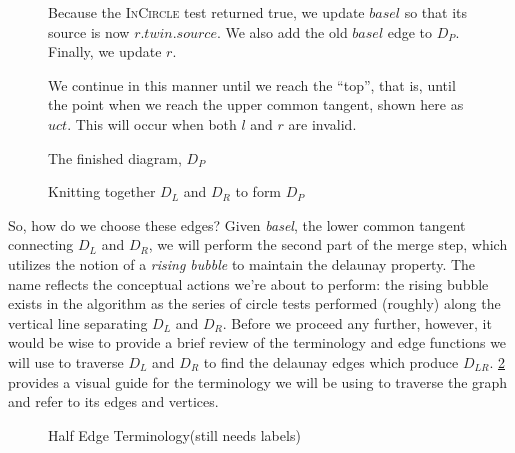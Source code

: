 \documentclass[12pt,twoside]{reedthesis}
\begin{document}
    \begin{figure}[p]
      \ContinuedFloat
      \begin{subtable}{\textwidth}
        \centering
        
        \caption{Because the \textsc{InCircle} test returned true, we update $basel$ so that its source is now $r.twin.source$. We also add the old $basel$ edge to $D_{P}$. Finally, we update $r$.}
        \label{fig:del_knit11}
      \end{subtable}

      \begin{subtable}{\textwidth}
        \centering
        
        \caption{We continue in this manner until we reach the ``top'', that is, until the point when we reach the upper common tangent, shown here as $uct$. This will occur when both $l$ and $r$ are invalid.}
        \label{fig:del_knit12}
      \end{subtable}

      \begin{subtable}{\textwidth}
        \centering
        
        \caption{The finished diagram, $D_{P}$}
        \label{fig:del_knit_done}
      \end{subtable}
      \caption{Knitting together $D_{L}$ and $D_{R}$ to form $D_{P}$}
      \label{fig:del_knit_all}
    \end{figure}


  So, how do we choose these edges? Given \emph{basel}, the lower common tangent connecting $D_{L}$ and $D_{R}$, we will perform the second part of the merge step, which utilizes the notion of a \emph{rising bubble} to maintain the delaunay property. The name reflects the conceptual actions we're about to perform: the rising bubble exists in the algorithm as the series of circle tests performed (roughly) along the vertical line separating $D_{L}$ and $D_{R}$. Before we proceed any further, however, it would be wise to provide a brief review of the terminology and edge functions we will use to traverse $D_{L}$ and $D_{R}$ to find the delaunay edges which produce $D_{LR}$. \cref{fig:half_edge} provides a visual guide for the terminology we will be using to traverse the graph and refer to its edges and vertices.

    \begin{figure}[!htb]
      \centering
      
      \caption{Half Edge Terminology(still needs labels)}
      \label{fig:half_edge}
    \end {figure}
\end{document}
